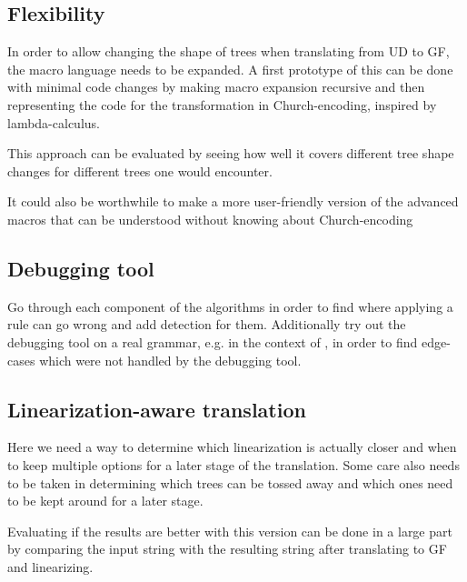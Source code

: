 \documentclass{article}
\begin{document}
\subsection{Flexibility}

In order to allow changing the shape of trees when translating from UD to GF, the macro language needs to be expanded.
A first prototype of this
can be done with minimal code changes by making macro expansion recursive and then representing the code for the transformation in Church-encoding, inspired by lambda-calculus.

This approach can be evaluated by seeing how well it covers different tree shape changes for different trees one would encounter.

It could also be worthwhile to make a more user-friendly version of the advanced macros that can be understood without knowing about Church-encoding

\subsection{Debugging tool}
Go through each component of the algorithms in order to find where applying a rule can go wrong and add detection for them. Additionally try out the debugging tool on a real grammar, e.g. in the context of \cite{listenmaa-etal-2021-towards}, in order to find edge-cases which were not handled by the debugging tool.


\subsection{Linearization-aware translation}
Here we need a way to determine which linearization is actually closer and when to keep multiple options for a later stage of the translation. Some care also needs to be taken in determining which trees can be tossed away and which ones need to be kept around for a later stage.

Evaluating if the results are better with this version can be done in a large part by comparing the input string with the resulting string after translating to GF and linearizing.
\end{document}
